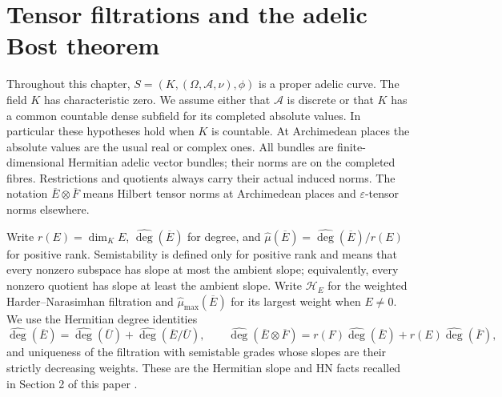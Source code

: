 \chapter{Tensor filtrations and the adelic Bost theorem}

Throughout this chapter, $S=(K,(\Omega,\mathcal A,\nu),\phi)$ is a proper
adelic curve. The field $K$ has characteristic zero. We assume either that
$\mathcal A$ is discrete or that $K$ has a common countable dense subfield
for its completed absolute values. In particular these hypotheses hold when
$K$ is countable. At Archimedean places the absolute values are the usual
real or complex ones. All bundles are finite-dimensional Hermitian adelic
vector bundles; their norms are on the completed fibres. Restrictions and
quotients always carry their actual induced norms. The notation
$\overline E\otimes\overline F$ means Hilbert tensor norms at Archimedean
places and $\varepsilon$-tensor norms elsewhere.

Write $r(E)=\dim_K E$, $\widehat{\deg}(\overline E)$ for degree, and
$\widehat\mu(\overline E)=\widehat{\deg}(\overline E)/r(E)$ for positive
rank. Semistability is defined only for positive rank and means that every
nonzero subspace has slope at most
the ambient slope; equivalently, every nonzero quotient has slope at least
the ambient slope. Write $\mathcal H_E$ for the weighted
Harder--Narasimhan filtration and $\widehat\mu_{\max}(\overline E)$ for its
largest weight when $E\ne0$. We use the Hermitian degree identities
\[
 \widehat{\deg}(\overline E)=
 \widehat{\deg}(\overline U)+\widehat{\deg}(\overline E/\overline U),
 \qquad
 \widehat{\deg}(\overline E\otimes\overline F)=
 r(F)\widehat{\deg}(\overline E)+r(E)\widehat{\deg}(\overline F),
\]
and uniqueness of the filtration with semistable grades whose slopes are
their strictly decreasing weights. These are the Hermitian slope and HN
facts recalled in Section 2 of this paper \cite{bost2026}.


